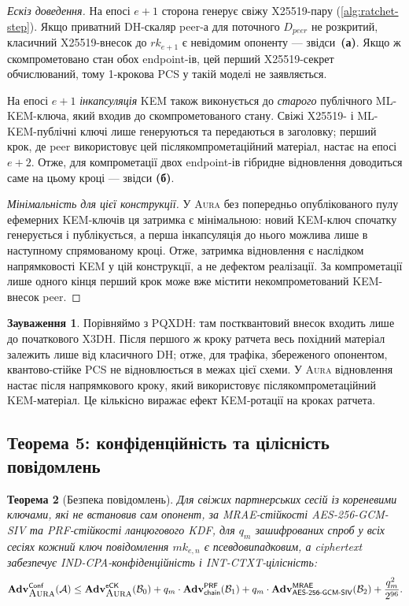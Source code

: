 \documentclass[11pt,a4paper]{article}
\newtheorem{theorem}{Теорема}[section]
\theoremstyle{definition}
\newtheorem{remark}[theorem]{Зауваження}
\newcommand{\adv}{\ensuremath{\mathbf{Adv}}}
\newcommand{\advA}{\ensuremath{\mathcal{A}}}
\newcommand{\advB}{\ensuremath{\mathcal{B}}}
\newcommand{\AEAD}{\textsf{AES-256-GCM-SIV}}
\renewcommand{\DH}{\textsf{X25519}}
\newcommand{\INDCPA}{\textsf{IND-CPA}}
\newcommand{\INTCTXT}{\textsf{INT-CTXT}}
\newcommand{\MRAE}{\textsf{MRAE}}
\newcommand{\PRF}{\textsf{PRF}}
\newcommand{\eCK}{\textsf{eCK}}
\newcommand{\rk}{\ensuremath{\mathit{rk}}}
\newcommand{\mk}{\ensuremath{\mathit{mk}}}
\newcommand{\Aura}{\mbox{\normalfont\scshape Aura}}
\begin{document}
\begin{proof}[Ескіз доведення]
На епосі $e+1$ сторона генерує свіжу \DH{}-пару
(\cref{alg:ratchet-step}). Якщо приватний DH-скаляр peer-а для поточного
$D_{\mathit{peer}}$ не розкритий, класичний \DH{}-внесок до $\rk_{e+1}$
є невідомим опоненту — звідси~\textbf{(а)}. Якщо ж скомпрометовано стан
обох endpoint-ів, цей перший \DH{}-секрет обчислюваний, тому 1-крокова
PCS у такій моделі не заявляється.

На епосі $e+1$ \emph{інкапсуляція} KEM також виконується до \emph{старого}
публічного ML-KEM-ключа, який входив до скомпрометованого стану. Свіжі
\DH{}- і ML-KEM-публічні ключі лише генеруються та передаються в заголовку;
перший крок, де peer використовує цей післякомпрометаційний матеріал, настає
на епосі $e+2$. Отже, для компрометації двох endpoint-ів гібридне
відновлення доводиться саме на цьому кроці — звідси \textbf{(б)}.

\emph{Мінімальність для цієї конструкції.} У \Aura{} без попередньо
опублікованого пулу ефемерних KEM-ключів ця затримка є мінімальною:
новий KEM-ключ спочатку генерується і публікується, а перша
інкапсуляція до нього можлива лише в наступному спрямованому кроці.
Отже, затримка відновлення є наслідком напрямковості KEM у цій
конструкції, а не дефектом реалізації. За компрометації лише одного
кінця перший крок може вже містити некомпрометований KEM-внесок peer.
\end{proof}

\begin{remark}
Порівняймо з PQXDH: там постквантовий внесок входить лише до
початкового X3DH. Після першого ж кроку ратчета весь похідний
матеріал залежить лише від класичного DH; отже, для трафіка,
збереженого опонентом, квантово-стійке PCS не відновлюється в межах
цієї схеми. У \Aura{} відновлення настає після напрямкового кроку, який
використовує післякомпрометаційний KEM-матеріал. Це кількісно виражає
ефект KEM-ротації на кроках ратчета.
\end{remark}

\subsection{Теорема 5: конфіденційність та цілісність
повідомлень}\label{sec:thm5}

\begin{theorem}[Безпека повідомлень]\label{thm:conf-int}
Для свіжих партнерських сесій із кореневими ключами, які не встановив
сам опонент, за \MRAE{}-стійкості \AEAD{} та \PRF{}-стійкості
ланцюгового KDF, для $q_m$ зашифрованих спроб у всіх сесіях кожний ключ
повідомлення $\mk_{e,n}$ є псевдовипадковим, а ciphertext забезпечує
\INDCPA{}-конфіденційність і \INTCTXT{}-цілісність:
\begin{equation}\label{eq:msg-security-bound}
  \adv^{\mathsf{Conf}}_{\Aura}(\advA)
  \le
  \adv^{\eCK}_{\Aura}(\advB_0)
  + q_m \cdot \adv^{\PRF}_{\mathsf{chain}}(\advB_1)
  + q_m \cdot \adv^{\MRAE}_{\AEAD}(\advB_2)
  + \frac{q_m^2}{2^{96}}.
\end{equation}
\end{theorem}
\end{document}
